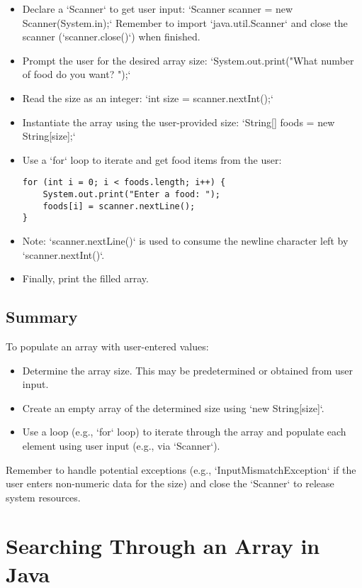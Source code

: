\documentclass{article}
\begin{document}
\begin{itemize}
    \item Declare a `Scanner` to get user input: `Scanner scanner = new Scanner(System.in);`  Remember to import `java.util.Scanner` and close the scanner (`scanner.close()`) when finished.
    \item Prompt the user for the desired array size: `System.out.print("What number of food do you want? ");`
    \item Read the size as an integer: `int size = scanner.nextInt();`
    \item Instantiate the array using the user-provided size:  `String[] foods = new String[size];`
    \item Use a `for` loop to iterate and get food items from the user:
    \begin{verbatim}
for (int i = 0; i < foods.length; i++) {
    System.out.print("Enter a food: ");
    foods[i] = scanner.nextLine(); 
}
    \end{verbatim}
    \item Note:  `scanner.nextLine()` is used to consume the newline character left by `scanner.nextInt()`.
    \item Finally, print the filled array.
\end{itemize}

\subsection{Summary}

To populate an array with user-entered values:

\begin{itemize}
    \item Determine the array size.  This may be predetermined or obtained from user input.
    \item Create an empty array of the determined size using `new String[size]`.
    \item Use a loop (e.g., `for` loop) to iterate through the array and populate each element using user input (e.g., via `Scanner`).
\end{itemize}  Remember to handle potential exceptions (e.g., `InputMismatchException` if the user enters non-numeric data for the size) and close the `Scanner` to release system resources.


\section{Searching Through an Array in Java}
\end{document}
